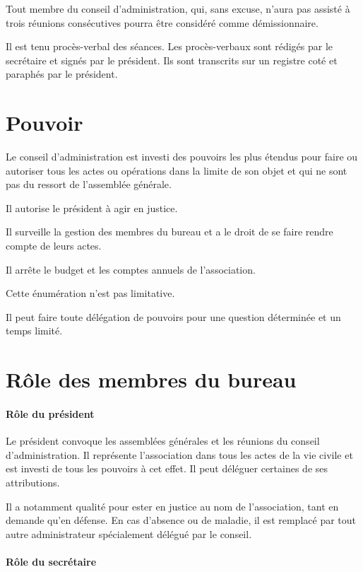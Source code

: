\documentclass[12 pt]{article}
\begin{document}
Tout membre du conseil d'administration, qui, sans excuse, n'aura pas
assisté à trois réunions consécutives pourra être considéré comme
démissionnaire.

Il est tenu procès-verbal des séances. Les procès-verbaux sont rédigés
par le secrétaire et signés par le président. Ils sont transcrits sur
un registre coté et paraphés par le président.

\section{Pouvoir}
\label{sec:pouvoir}

Le conseil d'administration est investi des pouvoirs les plus étendus
pour faire ou autoriser tous les actes ou opérations dans la limite de
son objet et qui ne sont pas du ressort de l'assemblée générale.

Il autorise le président à agir en justice.

Il surveille la gestion des membres du bureau et a le droit de se
faire rendre compte de leurs actes.

Il arrête le budget et les comptes annuels de l'association.

Cette énumération n'est pas limitative.

Il peut faire toute délégation de pouvoirs pour une question
déterminée et un temps limité.

\section{Rôle des membres du bureau}
\label{sec:role-des-membres-du-bureau}

\paragraph{Rôle du président}

Le président convoque les assemblées générales et les réunions du
conseil d'administration. Il représente l'association dans tous les
actes de la vie civile et est investi de tous les pouvoirs à cet
effet. Il peut déléguer certaines de ses attributions.

Il a notamment qualité pour ester en justice au nom de l'association,
tant en demande qu'en défense. En cas d'absence ou de maladie, il est
remplacé par tout autre administrateur spécialement délégué par le
conseil.

\paragraph{Rôle du secrétaire}
\end{document}
